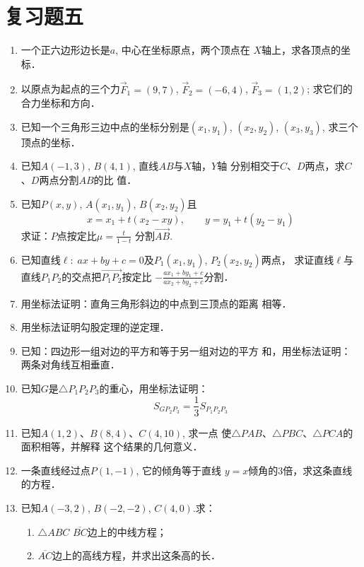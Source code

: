 \section*{复习题五}

\begin{enumerate}
    \item 一个正六边形边长是$a$, 中心在坐标原点，两个顶点在
    $X$轴上，求各顶点的坐标．
    \item 以原点为起点的三个力$\vec{F}_1=(9,7)$, $\vec{F}_2=(-6,4)$, 
    $\vec{F}_3=(1,2)$; 求它们的合力坐标和方向．
    \item 已知一个三角形三边中点的坐标分别是$(x_1,y_1)$, $(x_2,
    y_2)$, $(x_3,y_3)$, 求三个顶点的坐标．
    \item 已知$A(-1,3)$, $B(4,1)$, 直线$AB$与$X$轴，$Y$轴
    分别相交于$C$、$D$两点，求$C$、$D$两点分割$AB$的比
    值．
    \item 已知$P(x,y)$, $A(x_1,y_1)$, $B(x_2,y_2)$且
    \[x=x_1+t(x_2-xy),\qquad y=y_1+t(y_2-y_1)\]
    求证：$P$点按定比$\mu=\frac{t}{1-t}$
    分割$\Vec{AB}$.
    \item 已知直线$\ell:\; ax+by+c=0$及$P_1(x_1,y_1)$, $P_2(x_2,  y_2)$两点，
    求证直线$\ell$与直线$P_1P_2$的交点把$\Vec{P_1P_2}$按定比
$-\frac{ax_1+by_1+c}{ax_2+by_2+c}$分割．
\item 用坐标法证明：直角三角形斜边的中点到三顶点的距离
相等．
\item 用坐标法证明勾股定理的逆定理．
\item 已知：四边形一组对边的平方和等于另一组对边的平方
和，用坐标法证明：两条对角线互相垂直．
\item 已知$G$是$\triangle P_1P_2P_3$的重心，用坐标法证明：
\[S_{GP_2P_3}=\frac{1}{3}S_{P_1P_2P_3}\]
\item 已知$A(1,2)$、$B(8,4)$、$C(4,10)$, 求一点
使$\triangle PAB$、$\triangle PBC$、$\triangle PCA$的面积相等，并解释
这个结果的几何意义．
\item 一条直线经过点$P(1,-1)$, 它的倾角等于直线
$y=x$倾角的3倍，求这条直线的方程．
\item 已知$A(-3,2)$, $B(-2,-2)$, $C(4,0)$.求：
\begin{enumerate}
    \item $\triangle ABC$ $\overline{BC}$边上的中线方程；
    \item $\overline{AC}$边上的高线方程，并求出这条高的长．
\end{enumerate}


\end{enumerate}

